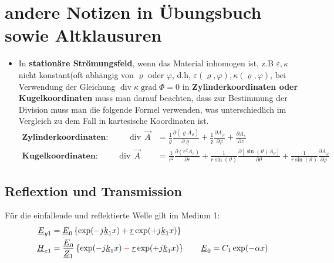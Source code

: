\documentclass[nochapterpage,bigchapter,linedtoc,longdoc,colorback,accentcolor=tud2c]{tudreport}
\DeclareMathOperator{\Div}{\mathrm{div}}
\DeclareMathOperator{\Grad}{\mathrm{grad}}
\newcommand*{\mathcolor}{}
\def\mathcolor#1#{\mathcoloraux{#1}}
\newcommand*{\mathcoloraux}[3]{%
  \protect\leavevmode
  \begingroup
    \color#1{#2}#3%
  \endgroup
}
\begin{document}
\section{andere Notizen in Übungsbuch sowie Altklausuren}
\begin{itemize}
	\item In \textbf{stationäre Strömungsfeld}, wenn das Material inhomogen ist, z.B $\varepsilon, \kappa$ nicht konstant(oft abhängig von $\varrho$ oder $\varphi$, d.h, \ul{ $\varepsilon(\varrho,\varphi ), \kappa(\varrho,\varphi )$}, bei Verwendung der Gleichung $\Div \kappa \Grad \Phi =0$  in \textbf{Zylinderkoordinaten oder Kugelkoordinaten} muss man darauf beachten, dass zur Bestimmung der Division muss man die folgende Formel verwenden, was unterschiedlich im Vergleich zu dem Fall in kartesische Koordinaten ist.
		\begin{equation*}
		\begin{aligned}
			\textbf{Zylinderkoordinaten: } \qquad \Div\, \vec{A} &= \frac{1}{\varrho}\frac{\partial(\varrho A_\varrho)}{\partial \varrho} + \frac{1}{\varrho} \frac{\partial A_\varphi}{\partial \varphi} + \frac{\partial A_z}{\partial z} \\
			\textbf{Kugelkoordinaten: } \qquad \Div \, \vec{A} &= \frac{1}{r^2} \frac{\partial (r^2 A_r)}{\partial r} + \frac{1}{r \sin(\vartheta)}\frac{\partial[\sin(\vartheta)A_\vartheta ]}{\partial \vartheta} + \frac{1}{r\sin(\vartheta)}\frac{\partial A_\varphi}{\partial \varphi}
		\end{aligned}
		\end{equation*}
\end{itemize}
\subsection{Reflextion und Transmission}
Für die einfallende und reflektierte Welle gilt im Medium 1:
\begin{equation*}\begin{aligned}
	\underline{E}_{y1} &= \underline{E}_0\left\{\exp(-j\underline{k}_1x ) + \underline{r}\exp(+j \underline{k}_1x )\right\} \\
	\underline{H}_{z1} &= \frac{\underline{E}_0}{\underline{Z}_1 }\left\{\exp(-j\underline{k}_1x ) \mathcolor{red}{-} \underline{r}\exp(+j \underline{k}_1x )\right\} \qquad \underline{E}_0 = C_1\exp(-\alpha x) \\ 
\end{aligned}
\end{equation*}
\end{document}
